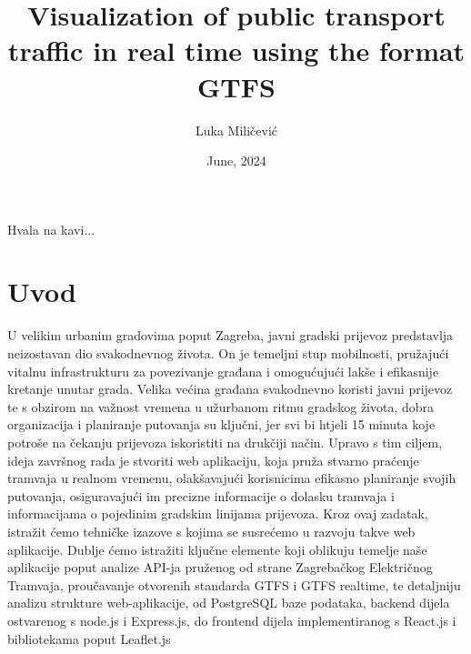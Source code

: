 \documentclass[zavrsnirad]{fer}
\title{Visualization of public transport traffic in real time using the format
	GTFS}
\author{Luka Miličević}
\date{June, 2024}
\begin{document}
\maketitle






\begin{zahvale}
  Hvala na kavi...
\end{zahvale}


\mainmatter


\tableofcontents


\chapter{Uvod}
\label{pog:uvod}

U velikim urbanim gradovima poput Zagreba, javni gradski prijevoz predstavlja neizostavan dio svakodnevnog života. On je temeljni stup mobilnosti, pružajući vitalnu infrastrukturu za povezivanje građana i omogućujući lakše i efikasnije kretanje unutar grada. Velika većina građana svakodnevno koristi javni prijevoz te s obzirom na važnost vremena u užurbanom ritmu gradskog života, dobra organizacija i planiranje putovanja su ključni, jer svi bi htjeli 15 minuta koje potroše na čekanju prijevoza iskoristiti na drukčiji način. Upravo s tim ciljem, ideja završnog rada je stvoriti web aplikaciju, koja pruža stvarno praćenje tramvaja u realnom vremenu, olakšavajući korisnicima efikasno planiranje svojih putovanja, osiguravajući im precizne informacije o dolasku tramvaja i informacijama o pojedinim gradskim linijama prijevoza. Kroz ovaj zadatak, istražit ćemo tehničke izazove s kojima se susrećemo u razvoju takve web aplikacije. Dublje ćemo istražiti ključne elemente koji oblikuju temelje naše aplikacije poput analize API-ja pruženog od strane Zagrebačkog Električnog Tramvaja, proučavanje otvorenih standarda GTFS i GTFS realtime, te detaljniju analizu strukture web-aplikacije, od PostgreSQL baze podataka, backend dijela ostvarenog s node.js i Express.js, do frontend dijela implementiranog s React.js i bibliotekama poput Leaflet.js
\end{document}
